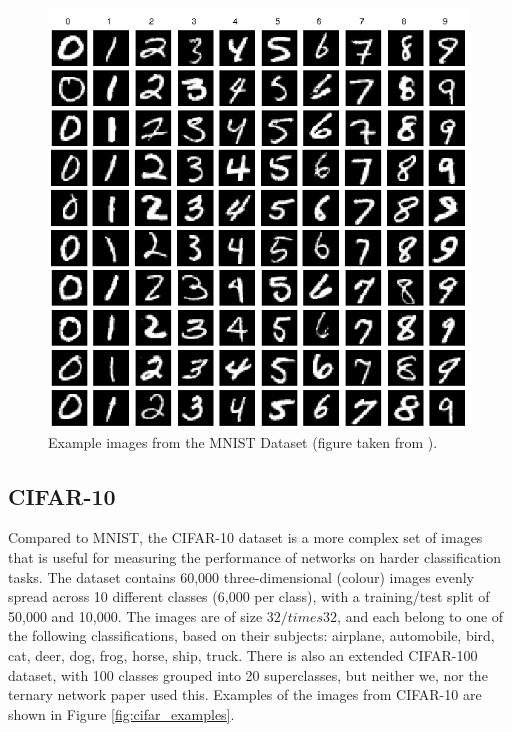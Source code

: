 \documentclass[11pt,a4paper,oldfontcommands]{memoir}
\begin{document}
\begin{figure}
    \centering
    \includegraphics[width=30em]{Images/Example-images-from-the-MNIST-dataset.png}
    \caption{Example images from the MNIST Dataset (figure taken from \cite{ds_analysis}).}
    \label{fig:mnist_examples}
\end{figure}

\subsection{CIFAR-10}
Compared to MNIST, the CIFAR-10 dataset is a more complex set of images that is useful for measuring the performance of networks on harder classification tasks. The dataset contains 60,000 three-dimensional (colour) images evenly spread across 10 different classes (6,000 per class), with a training/test split of 50,000 and 10,000. The images are of size $32 /times 32$, and each belong to one of the following classifications, based on their subjects: airplane, automobile, bird, cat, deer, dog, frog, horse, ship, truck. There is also an extended CIFAR-100 dataset, with 100 classes grouped into 20 superclasses, but neither we, nor the ternary network paper \cite{ternary} used this. Examples of the images from CIFAR-10 are shown in Figure \ref{fig:cifar_examples}.
\end{document}
